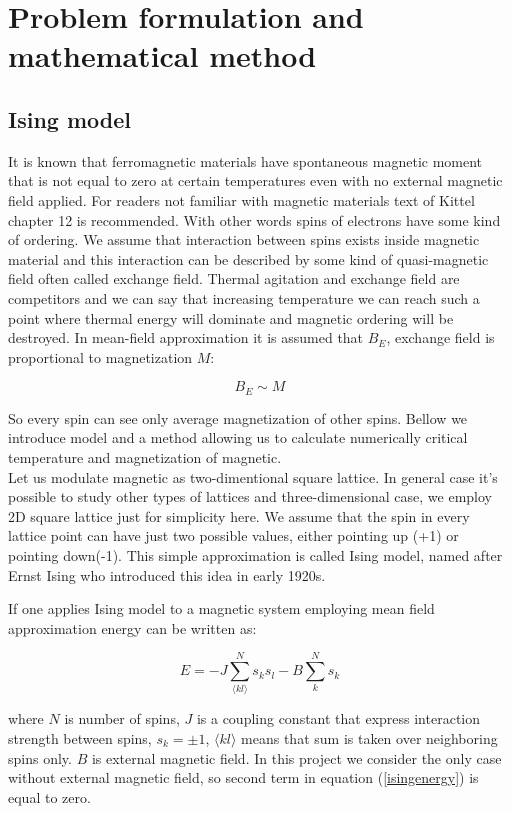 \documentclass[10pt]{article}
\begin{document}
\newpage
\section{Problem formulation and mathematical method}\label{Part1}



\subsection{Ising model}
It is known that ferromagnetic materials have spontaneous magnetic moment that is not equal to zero at certain temperatures even with no external magnetic field applied. For readers not familiar with magnetic materials text of Kittel \cite{Kittel} chapter 12 is recommended.
With other words spins of electrons have some kind of ordering. We assume that interaction between spins exists inside magnetic material and 
this interaction can be described by some kind of quasi-magnetic field often called exchange field. Thermal agitation and exchange field are competitors and we can say that increasing temperature we can reach such a point where thermal energy will dominate and magnetic ordering will be destroyed.
In mean-field approximation it is assumed that $B_E$, exchange field is proportional to magnetization $M$:

\[
B_E \sim M
\]

So every spin can see only average magnetization of other spins. Bellow we introduce model and a method allowing us to calculate numerically critical temperature and 
magnetization of magnetic. \\
Let us modulate magnetic as two-dimentional square lattice. In general case it's possible to study other types of lattices and three-dimensional case, we employ 2D square lattice
just for simplicity here. We assume that the spin in every lattice point can have just two possible values, either pointing up (+1) or pointing down(-1). This simple approximation is
called Ising model, named after Ernst Ising who introduced this idea in early 1920s.

If one applies Ising model to a magnetic system employing mean field approximation energy can be written as:

\begin{equation}\label{isingenergy}
E=-J\sum_{\langle kl\rangle }^{N}s_{k}s_{l} - B\sum_{k}^{N}s_k
\end{equation}

where $N$ is number of spins, $J$ is a coupling constant that express interaction
strength between spins, $s_{k}=\pm 1$, $\langle kl\rangle $
means that sum is taken over neighboring spins only. $B$ is external magnetic field.
In this project we consider the only case without external magnetic field, so second term in equation (\ref{isingenergy}) is equal to zero.\\
\end{document}
